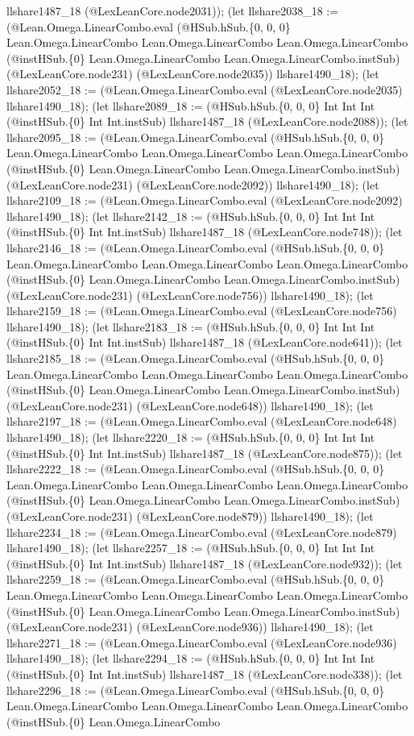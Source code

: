 \documentclass[11pt]{article}
\begin{document}
llshare1487\_18 (@LexLeanCore.node2031)); (let llshare2038\_18 := (@Lean.Omega.LinearCombo.eval (@HSub.hSub.\{0, 0, 0\} Lean.Omega.LinearCombo Lean.Omega.LinearCombo Lean.Omega.LinearCombo (@instHSub.\{0\} Lean.Omega.LinearCombo Lean.Omega.LinearCombo.instSub) (@LexLeanCore.node231) (@LexLeanCore.node2035)) llshare1490\_18); (let llshare2052\_18 := (@Lean.Omega.LinearCombo.eval (@LexLeanCore.node2035) llshare1490\_18); (let llshare2089\_18 := (@HSub.hSub.\{0, 0, 0\} Int Int Int (@instHSub.\{0\} Int Int.instSub) llshare1487\_18 (@LexLeanCore.node2088)); (let llshare2095\_18 := (@Lean.Omega.LinearCombo.eval (@HSub.hSub.\{0, 0, 0\} Lean.Omega.LinearCombo Lean.Omega.LinearCombo Lean.Omega.LinearCombo (@instHSub.\{0\} Lean.Omega.LinearCombo Lean.Omega.LinearCombo.instSub) (@LexLeanCore.node231) (@LexLeanCore.node2092)) llshare1490\_18); (let llshare2109\_18 := (@Lean.Omega.LinearCombo.eval (@LexLeanCore.node2092) llshare1490\_18); (let llshare2142\_18 := (@HSub.hSub.\{0, 0, 0\} Int Int Int (@instHSub.\{0\} Int Int.instSub) llshare1487\_18 (@LexLeanCore.node748)); (let llshare2146\_18 := (@Lean.Omega.LinearCombo.eval (@HSub.hSub.\{0, 0, 0\} Lean.Omega.LinearCombo Lean.Omega.LinearCombo Lean.Omega.LinearCombo (@instHSub.\{0\} Lean.Omega.LinearCombo Lean.Omega.LinearCombo.instSub) (@LexLeanCore.node231) (@LexLeanCore.node756)) llshare1490\_18); (let llshare2159\_18 := (@Lean.Omega.LinearCombo.eval (@LexLeanCore.node756) llshare1490\_18); (let llshare2183\_18 := (@HSub.hSub.\{0, 0, 0\} Int Int Int (@instHSub.\{0\} Int Int.instSub) llshare1487\_18 (@LexLeanCore.node641)); (let llshare2185\_18 := (@Lean.Omega.LinearCombo.eval (@HSub.hSub.\{0, 0, 0\} Lean.Omega.LinearCombo Lean.Omega.LinearCombo Lean.Omega.LinearCombo (@instHSub.\{0\} Lean.Omega.LinearCombo Lean.Omega.LinearCombo.instSub) (@LexLeanCore.node231) (@LexLeanCore.node648)) llshare1490\_18); (let llshare2197\_18 := (@Lean.Omega.LinearCombo.eval (@LexLeanCore.node648) llshare1490\_18); (let llshare2220\_18 := (@HSub.hSub.\{0, 0, 0\} Int Int Int (@instHSub.\{0\} Int Int.instSub) llshare1487\_18 (@LexLeanCore.node875)); (let llshare2222\_18 := (@Lean.Omega.LinearCombo.eval (@HSub.hSub.\{0, 0, 0\} Lean.Omega.LinearCombo Lean.Omega.LinearCombo Lean.Omega.LinearCombo (@instHSub.\{0\} Lean.Omega.LinearCombo Lean.Omega.LinearCombo.instSub) (@LexLeanCore.node231) (@LexLeanCore.node879)) llshare1490\_18); (let llshare2234\_18 := (@Lean.Omega.LinearCombo.eval (@LexLeanCore.node879) llshare1490\_18); (let llshare2257\_18 := (@HSub.hSub.\{0, 0, 0\} Int Int Int (@instHSub.\{0\} Int Int.instSub) llshare1487\_18 (@LexLeanCore.node932)); (let llshare2259\_18 := (@Lean.Omega.LinearCombo.eval (@HSub.hSub.\{0, 0, 0\} Lean.Omega.LinearCombo Lean.Omega.LinearCombo Lean.Omega.LinearCombo (@instHSub.\{0\} Lean.Omega.LinearCombo Lean.Omega.LinearCombo.instSub) (@LexLeanCore.node231) (@LexLeanCore.node936)) llshare1490\_18); (let llshare2271\_18 := (@Lean.Omega.LinearCombo.eval (@LexLeanCore.node936) llshare1490\_18); (let llshare2294\_18 := (@HSub.hSub.\{0, 0, 0\} Int Int Int (@instHSub.\{0\} Int Int.instSub) llshare1487\_18 (@LexLeanCore.node338)); (let llshare2296\_18 := (@Lean.Omega.LinearCombo.eval (@HSub.hSub.\{0, 0, 0\} Lean.Omega.LinearCombo Lean.Omega.LinearCombo Lean.Omega.LinearCombo (@instHSub.\{0\} Lean.Omega.LinearCombo 
\end{document}
